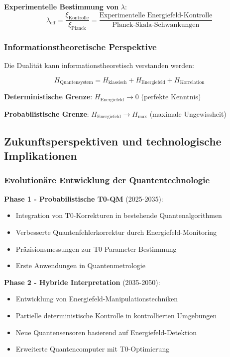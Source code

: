 \documentclass[12pt,a4paper]{article}
\theoremstyle{definition}
\theoremstyle{remark}
\begin{document}
\textbf{Experimentelle Bestimmung von } $\lambda$:
\begin{equation}
	\lambda_{\text{eff}} = \frac{\xi_{\text{Kontrolle}}}{\xi_{\text{Planck}}} = \frac{\text{Experimentelle Energiefeld-Kontrolle}}{\text{Planck-Skala-Schwankungen}}
\end{equation}

\subsubsection{Informationstheoretische Perspektive}

Die Dualität kann informationstheoretisch verstanden werden:

\begin{equation}
	H_{\text{Quantensystem}} = H_{\text{klassisch}} + H_{\text{Energiefeld}} + H_{\text{Korrelation}}
	\label{eq:information_decomposition}
\end{equation}

\textbf{Deterministische Grenze}: $H_{\text{Energiefeld}} \rightarrow 0$ (perfekte Kenntnis)

\textbf{Probabilistische Grenze}: $H_{\text{Energiefeld}} \rightarrow H_{\max}$ (maximale Ungewissheit)

\subsection{Zukunftsperspektiven und technologische Implikationen}

\subsubsection{Evolutionäre Entwicklung der Quantentechnologie}

\textbf{Phase 1 - Probabilistische T0-QM} (2025-2035):
\begin{itemize}
	\item Integration von T0-Korrekturen in bestehende Quantenalgorithmen
	\item Verbesserte Quantenfehlerkorrektur durch Energiefeld-Monitoring
	\item Präzisionsmessungen zur T0-Parameter-Bestimmung
	\item Erste Anwendungen in Quantenmetrologie
\end{itemize}

\textbf{Phase 2 - Hybride Interpretation} (2035-2050):
\begin{itemize}
	\item Entwicklung von Energiefeld-Manipulationstechniken
	\item Partielle deterministische Kontrolle in kontrollierten Umgebungen
	\item Neue Quantensensoren basierend auf Energiefeld-Detektion
	\item Erweiterte Quantencomputer mit T0-Optimierung
\end{itemize}
\end{document}
